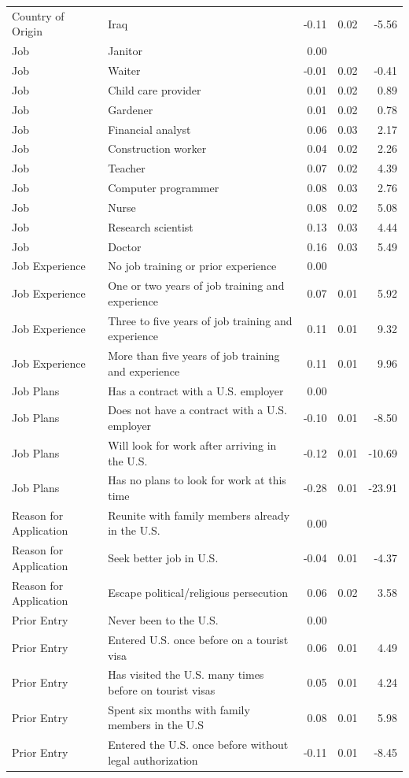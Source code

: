 \documentclass[a4paper,12pt]{article}\usepackage[]{graphicx}\usepackage[]{color}
\begin{document}
\begin{table}[ht]
\begin{tabular}{lp{3in}rrr}
  Country of Origin & Iraq & -0.11 & 0.02 & -5.56 \\ 
  Job & Janitor & 0.00 &  &  \\ 
  Job & Waiter & -0.01 & 0.02 & -0.41 \\ 
  Job & Child care provider & 0.01 & 0.02 & 0.89 \\ 
  Job & Gardener & 0.01 & 0.02 & 0.78 \\ 
  Job & Financial analyst & 0.06 & 0.03 & 2.17 \\ 
  Job & Construction worker & 0.04 & 0.02 & 2.26 \\ 
  Job & Teacher & 0.07 & 0.02 & 4.39 \\ 
  Job & Computer programmer & 0.08 & 0.03 & 2.76 \\ 
  Job & Nurse & 0.08 & 0.02 & 5.08 \\ 
  Job & Research scientist & 0.13 & 0.03 & 4.44 \\ 
  Job & Doctor & 0.16 & 0.03 & 5.49 \\ 
  Job Experience & No job training or prior experience & 0.00 &  &  \\ 
  Job Experience & One or two years of job training and experience & 0.07 & 0.01 & 5.92 \\ 
  Job Experience & Three to five years of job training and experience & 0.11 & 0.01 & 9.32 \\ 
  Job Experience & More than five years of job training and experience & 0.11 & 0.01 & 9.96 \\ 
  Job Plans & Has a contract with a U.S. employer & 0.00 &  &  \\ 
  Job Plans & Does not have a contract with a U.S. employer & -0.10 & 0.01 & -8.50 \\ 
  Job Plans & Will look for work after arriving in the U.S. & -0.12 & 0.01 & -10.69 \\ 
  Job Plans & Has no plans to look for work at this time & -0.28 & 0.01 & -23.91 \\ 
  Reason for Application & Reunite with family members already in the U.S. & 0.00 &  &  \\ 
  Reason for Application & Seek better job in U.S. & -0.04 & 0.01 & -4.37 \\ 
  Reason for Application & Escape political/religious persecution & 0.06 & 0.02 & 3.58 \\ 
  Prior Entry & Never been to the U.S. & 0.00 &  &  \\ 
  Prior Entry & Entered U.S. once before on a tourist visa & 0.06 & 0.01 & 4.49 \\ 
  Prior Entry & Has visited the U.S. many times before on tourist visas & 0.05 & 0.01 & 4.24 \\ 
  Prior Entry & Spent six months with family members in the U.S & 0.08 & 0.01 & 5.98 \\ 
  Prior Entry & Entered the U.S. once before without legal authorization & -0.11 & 0.01 & -8.45 \\ 
   \hline
\end{tabular}
\endgroup
\end{table}
\end{document}
